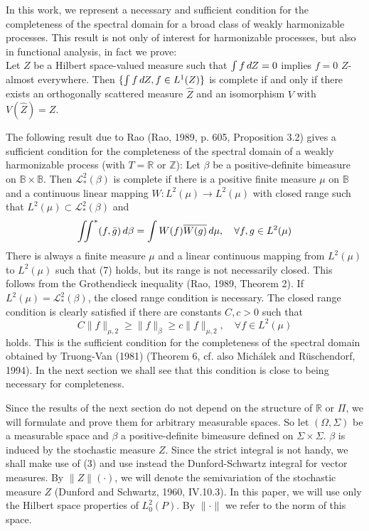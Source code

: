 \documentclass{article}
\newcommand{\cdummy}{\cdot}
\begin{document}
In this work, we represent a necessary and sufficient condition for the
completeness of the spectral domain for a broad class of weakly harmonizable
processes. This result is not only of interest for harmonizable processes, but
also in functional analysis, in fact we prove:\\
Let $Z$ be a Hilbert space-valued measure such that $\int f \hspace{0.17em} dZ
= 0$ implies $f = 0$ $Z$-almost everywhere. Then $\{ \int f \hspace{0.17em}
dZ, f \in L^1 (Z)\}$ is complete if and only if there exists an orthogonally
scattered measure $\hat{Z}$ and an isomorphism $V$ with $V (\hat{Z}) = Z$.

The following result due to Rao (Rao, 1989, p. 605, Proposition 3.2) gives a
sufficient condition for the completeness of the spectral domain of a weakly
harmonizable process (with $T =\mathbb{R}$ or $\mathbb{Z}$): Let $\beta$ be a
positive-definite bimeasure on $\mathbb{B} \times \mathbb{B}$. Then
$\mathscr{L}_{\ast}^2 (\beta)$ is complete if there is a positive finite
measure $\mu$ on $\mathbb{B}$ and a continuous linear mapping $W : L^2 (\mu)
\to L^2 (\mu)$ with closed range such that $L^2 (\mu) \subset
\mathscr{L}_{\ast}^2 (\beta)$ and
\begin{equation}
  \iint^{\ast} (f, \bar{g})  \hspace{0.17em} d \beta = \int W (f) \overline{W
  (g)} \hspace{0.17em} d \mu, \quad \forall f, g \in L^2 (\mu)
\end{equation}
There is always a finite measure $\mu$ and a linear continuous mapping from
$L^2 (\mu)$ to $L^2 (\mu)$ such that (7) holds, but its range is not
necessarily closed. This follows from the Grothendieck inequality (Rao, 1989,
Theorem 2). If $L^2 (\mu) = \mathscr{L}_{\ast}^2 (\beta)$, the closed range
condition is necessary. The closed range condition is clearly satisfied if
there are constants $C, c > 0$ such that
\begin{equation}
  C \|f\|_{\mu, 2} \geq \|f\|_{\beta} \geq c \|f\|_{\mu, 2}, \quad \forall f
  \in L^2 (\mu)
\end{equation}
holds. This is the sufficient condition for the completeness of the spectral
domain obtained by Truong-Van (1981) (Theorem 6, cf. also Mich{\'a}lek and
R{\"u}schendorf, 1994). In the next section we shall see that this condition
is close to being necessary for completeness.

Since the results of the next section do not depend on the structure of
$\mathbb{R}$ or $\Pi$, we will formulate and prove them for arbitrary
measurable spaces. So let $(\Omega, \Sigma)$ be a measurable space and $\beta$
a positive-definite bimeasure defined on $\Sigma \times \Sigma$. $\beta$ is
induced by the stochastic measure $Z$. Since the strict integral is not handy,
we shall make use of (3) and use instead the Dunford-Schwartz integral for
vector measures. By $\|Z\| (\cdummy)$, we will denote the semivariation of the
stochastic measure $Z$ (Dunford and Schwartz, 1960, IV.10.3). In this paper,
we will use only the Hilbert space properties of $L_0^2 (P)$. By $\| \cdummy
\|$ we refer to the norm of this space.
\end{document}
